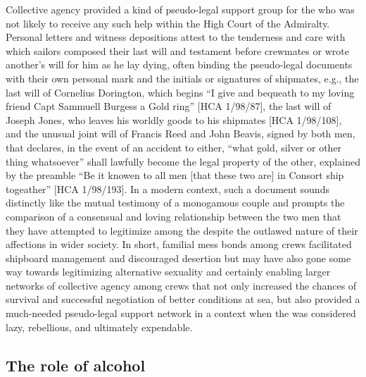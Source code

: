 Collective agency provided a kind of pseudo-legal support group for the  who was not likely to receive any such help within the High Court of the Admiralty. Personal letters and witness depositions attest to the tenderness and care with which sailors composed their last will and testament before crewmates or wrote another’s will for him as he lay dying, often binding the pseudo-legal documents with their own personal mark and the initials or signatures of shipmates, e.g., the last will of Cornelius Dorington, which begins “I give and bequeath to my loving friend Capt Sammuell Burgess a Gold ring” [HCA 1/98/87], the last will of Joseph Jones, who leaves his worldly goods to his shipmates [HCA 1/98/108], and the unusual joint will of Francis Reed and John Beavis, signed by both men, that declares, in the event of an accident to either, “what gold, silver or other thing whatsoever” shall lawfully become the legal property of the other, explained by the preamble “Be it knowen to all men [that these two are] in Consort ship togeather” [HCA 1/98/193]. In a modern context, such a document sounds distinctly like the mutual testimony of a monogamous couple and prompts the comparison of a consensual and loving relationship between the two men that they have attempted to legitimize among the  despite the outlawed nature of their affections in wider society. In short, familial mess bonds among crews facilitated shipboard management and discouraged desertion but may have also gone some way towards legitimizing alternative sexuality and certainly enabling larger networks of collective agency among crews that not only increased the chances of survival and successful negotiation of better conditions at sea, but also provided a much-needed pseudo-legal support network in a context when the  was considered lazy, rebellious, and ultimately expendable. 

\subsection{{The role of alcohol} }\label{sec:4.2.5}

